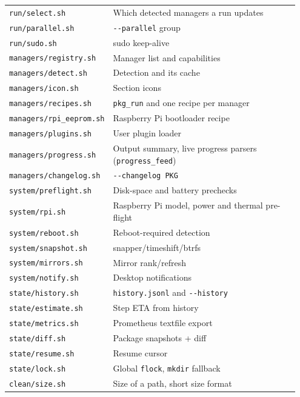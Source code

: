 \documentclass[11pt,a4paper]{article}
\begin{document}
\begin{center}
\begin{longtable}{@{}p{0.25\linewidth} p{0.70\linewidth}@{}}
\texttt{run/select.sh}            & Which detected managers a run updates \\
\texttt{run/parallel.sh}          & \texttt{-{}-parallel} group \\
\texttt{run/sudo.sh}              & sudo keep-alive \\
\texttt{managers/registry.sh}     & Manager list and capabilities \\
\texttt{managers/detect.sh}       & Detection and its cache \\
\texttt{managers/icon.sh}         & Section icons \\
\texttt{managers/recipes.sh}      & \texttt{pkg\_run} and one recipe per manager \\
\texttt{managers/rpi\_eeprom.sh}   & Raspberry Pi bootloader recipe \\
\texttt{managers/plugins.sh}      & User plugin loader \\
\texttt{managers/progress.sh}     & Output summary, live progress parsers (\texttt{progress\_feed}) \\
\texttt{managers/changelog.sh}    & \texttt{-{}-changelog PKG} \\
\texttt{system/preflight.sh}      & Disk-space and battery prechecks \\
\texttt{system/rpi.sh}            & Raspberry Pi model, power and thermal pre-flight \\
\texttt{system/reboot.sh}         & Reboot-required detection \\
\texttt{system/snapshot.sh}       & snapper/timeshift/btrfs \\
\texttt{system/mirrors.sh}        & Mirror rank/refresh \\
\texttt{system/notify.sh}         & Desktop notifications \\
\texttt{state/history.sh}         & \texttt{history.jsonl} and \texttt{-{}-history} \\
\texttt{state/estimate.sh}        & Step ETA from history \\
\texttt{state/metrics.sh}         & Prometheus textfile export \\
\texttt{state/diff.sh}            & Package snapshots + diff \\
\texttt{state/resume.sh}          & Resume cursor \\
\texttt{state/lock.sh}            & Global \texttt{flock}, \texttt{mkdir} fallback \\
\texttt{clean/size.sh}            & Size of a path, short size format \\

\end{longtable}
\end{center}
\end{document}
